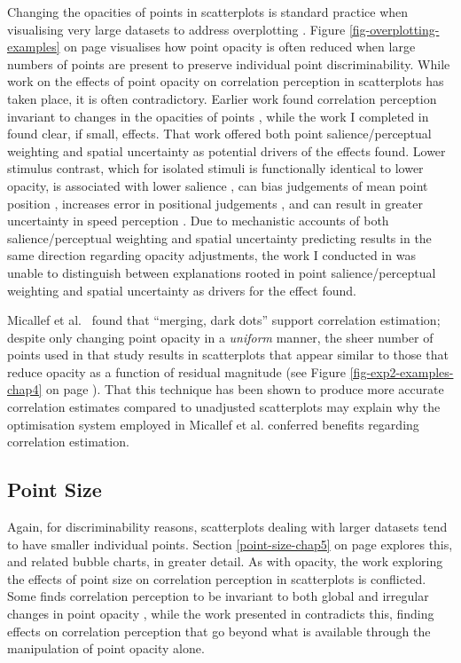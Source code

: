 \documentclass[../main.tex]{subfiles}
\begin{document}
Changing the opacities of points in scatterplots is standard practice
when visualising very large datasets to address overplotting
\cite{matejka_2015}. Figure \ref{fig-overplotting-examples} on page
\pageref{fig-overplotting-examples} visualises how point opacity is
often reduced when large numbers of points are present to preserve
individual point discriminability. While work on the effects of point
opacity on correlation perception in scatterplots has taken place, it is
often contradictory. Earlier work found correlation perception invariant
to changes in the opacities of points \cite{rensink_2012, rensink_2014},
while the work I completed in  found clear,
if small, effects. That work offered both point salience/perceptual
weighting and spatial uncertainty as potential drivers of the effects
found. Lower stimulus contrast, which for isolated stimuli is
functionally identical to lower opacity, is associated with lower
salience \cite{healey_2012}, can bias judgements of mean point position
\cite{hong_2022}, increases error in positional judgements
\cite{wehrhahn_1990}, and can result in greater uncertainty in speed
perception \cite{champion_2017}. Due to mechanistic accounts of both
salience/perceptual weighting and spatial uncertainty predicting results
in the same direction regarding opacity adjustments, the work I
conducted in  was unable to distinguish
between explanations rooted in point salience/perceptual weighting and
spatial uncertainty as drivers for the effect found.

Micallef et al.~\cite{micallef_2017} found that ``merging, dark dots''
support correlation estimation; despite only changing point opacity in a
\emph{uniform} manner, the sheer number of points used in that study
results in scatterplots that appear similar to those that reduce opacity
as a function of residual magnitude (see Figure
\ref{fig-exp2-examples-chap4} on page
\pageref{fig-exp2-examples-chap4}). That this technique has been shown
to produce more accurate correlation estimates compared to unadjusted
scatterplots may explain why the optimisation system employed in
Micallef et al. \cite{micallef_2017} conferred benefits regarding
correlation estimation.

\subsection{Point Size}\label{point-size}

Again, for discriminability reasons, scatterplots dealing with larger
datasets tend to have smaller individual points. Section
\ref{point-size-chap5} on page \pageref{point-size-chap5} explores this,
and related bubble charts, in greater detail. As with opacity, the work
exploring the effects of point size on correlation perception in
scatterplots is conflicted. Some finds correlation perception to be
invariant to both global and irregular changes in point opacity
\cite{rensink_2012, rensink_2014}, while the work presented in
 contradicts this, finding effects on
correlation perception that go beyond what is available through the
manipulation of point opacity alone.
\end{document}
